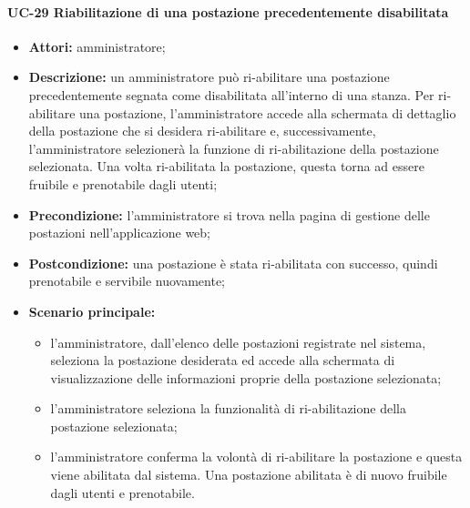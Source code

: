 \paragraph{UC-29 Riabilitazione di una postazione precedentemente disabilitata}
\begin{itemize}
    \item \textbf{Attori:} amministratore;
    \item \textbf{Descrizione:} un amministratore pu\`{o} ri-abilitare una postazione precedentemente segnata come disabilitata all'interno di una stanza. Per ri-abilitare una postazione, l'amministratore accede alla schermata di dettaglio della postazione che si desidera ri-abilitare e, successivamente, l'amministratore selezionerà la funzione di ri-abilitazione della postazione selezionata. Una volta ri-abilitata la postazione, questa torna ad essere fruibile e prenotabile dagli utenti;
    \item \textbf{Precondizione:} l'amministratore si trova nella pagina di gestione delle postazioni nell'applicazione web;
    \item \textbf{Postcondizione:} una postazione \`{e} stata ri-abilitata con successo, quindi prenotabile e servibile nuovamente;
    \item \textbf{Scenario principale:}
    \begin{itemize}
        \item l'amministratore, dall'elenco delle postazioni registrate nel sistema, seleziona la postazione desiderata ed accede alla schermata di visualizzazione delle informazioni proprie della postazione selezionata;
        \item l'amministratore seleziona la funzionalità di ri-abilitazione della postazione selezionata;
        \item l'amministratore conferma la volontà di ri-abilitare la postazione e questa viene abilitata dal sistema. Una postazione abilitata è di nuovo fruibile dagli utenti e prenotabile.
    \end{itemize}
\end{itemize}
